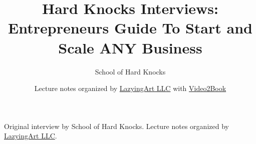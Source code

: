 \documentclass[11pt,oneside]{book}
\begin{document}
\frontmatter
\title{Hard Knocks Interviews: Entrepreneurs Guide To Start and Scale ANY Business}
\author{School of Hard Knocks}
\date{Lecture notes organized by \href{https://lazying.art}{LazyingArt LLC} with \href{https://github.com/lachlanchen/Video2Book}{Video2Book}}
\maketitle
\begin{center}
\small Original interview by School of Hard Knocks. Lecture notes organized by \href{https://lazying.art}{LazyingArt LLC}.
\end{center}
\clearpage
\mainmatter

\end{document}
